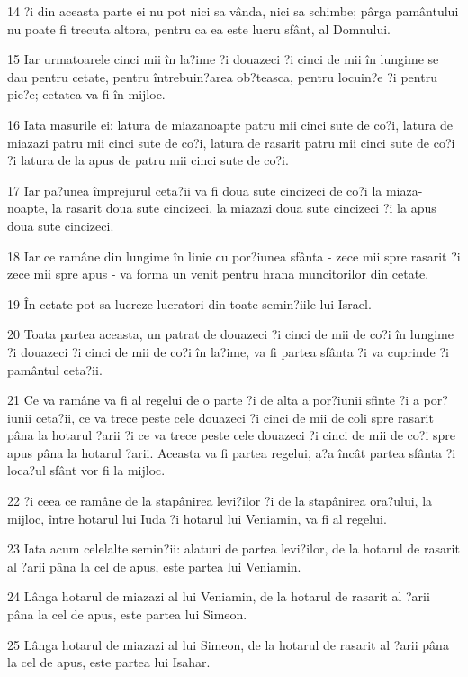 \par 14 ?i din aceasta parte ei nu pot nici sa vânda, nici sa schimbe; pârga pamântului nu poate fi trecuta altora, pentru ca ea este lucru sfânt, al Domnului.
\par 15 Iar urmatoarele cinci mii în la?ime ?i douazeci ?i cinci de mii în lungime se dau pentru cetate, pentru întrebuin?area ob?teasca, pentru locuin?e ?i pentru pie?e; cetatea va fi în mijloc.
\par 16 Iata masurile ei: latura de miazanoapte patru mii cinci sute de co?i, latura de miazazi patru mii cinci sute de co?i, latura de rasarit patru mii cinci sute de co?i ?i latura de la apus de patru mii cinci sute de co?i.
\par 17 Iar pa?unea împrejurul ceta?ii va fi doua sute cincizeci de co?i la miaza-noapte, la rasarit doua sute cincizeci, la miazazi doua sute cincizeci ?i la apus doua sute cincizeci.
\par 18 Iar ce ramâne din lungime în linie cu por?iunea sfânta - zece mii spre rasarit ?i zece mii spre apus - va forma un venit pentru hrana muncitorilor din cetate.
\par 19 În cetate pot sa lucreze lucratori din toate semin?iile lui Israel.
\par 20 Toata partea aceasta, un patrat de douazeci ?i cinci de mii de co?i în lungime ?i douazeci ?i cinci de mii de co?i în la?ime, va fi partea sfânta ?i va cuprinde ?i pamântul ceta?ii.
\par 21 Ce va ramâne va fi al regelui de o parte ?i de alta a por?iunii sfinte ?i a por?iunii ceta?ii, ce va trece peste cele douazeci ?i cinci de mii de coli spre rasarit pâna la hotarul ?arii ?i ce va trece peste cele douazeci ?i cinci de mii de co?i spre apus pâna la hotarul ?arii. Aceasta va fi partea regelui, a?a încât partea sfânta ?i loca?ul sfânt vor fi la mijloc.
\par 22 ?i ceea ce ramâne de la stapânirea levi?ilor ?i de la stapânirea ora?ului, la mijloc, între hotarul lui Iuda ?i hotarul lui Veniamin, va fi al regelui.
\par 23 Iata acum celelalte semin?ii: alaturi de partea levi?ilor, de la hotarul de rasarit al ?arii pâna la cel de apus, este partea lui Veniamin.
\par 24 Lânga hotarul de miazazi al lui Veniamin, de la hotarul de rasarit al ?arii pâna la cel de apus, este partea lui Simeon.
\par 25 Lânga hotarul de miazazi al lui Simeon, de la hotarul de rasarit al ?arii pâna la cel de apus, este partea lui Isahar.
